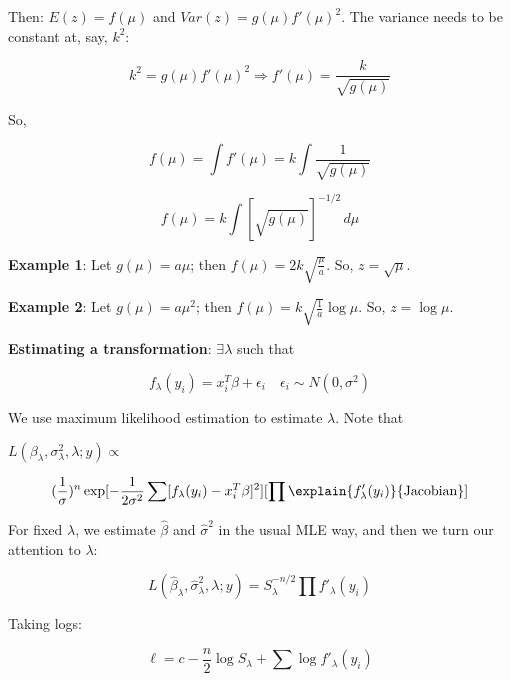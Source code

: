 Then: $E(z)=f(\mu)$ and $Var(z)=g(\mu) f'(\mu)^2$. The variance needs to be constant at, say, $k^2$:

\begin{equation}
k^2 = g(\mu) f'(\mu)^2 \Rightarrow f'(\mu)=\frac{k}{\sqrt{g(\mu)}}
\end{equation}

So, 

\begin{equation}
f(\mu) = \int f'(\mu) = k\int \frac{1}{\sqrt{g(\mu)}}
\end{equation}

\begin{fmpage}{\linewidth}
\begin{equation}
f(\mu) =  k\int [\sqrt{g(\mu)}]^{-1/2}\, d\mu
\end{equation}
\end{fmpage}

\textbf{Example 1}: Let $g(\mu)=a\mu$; then $f(\mu)=2k\sqrt{\frac{\mu}{a}}$. So, $z=\sqrt{\mu}$.

\textbf{Example 2}: Let $g(\mu)=a\mu^2$; then $f(\mu)=k\sqrt{\frac{1}{a}}\log \mu$. So, $z=\log \mu$.

\textbf{Estimating a transformation}: $\exists \lambda$ such that 

\begin{equation}
f_\lambda (y_i) = x_i^T \beta + \epsilon_i \quad \epsilon_i \sim N(0, \sigma^2)
\end{equation}

We use maximum likelihood estimation to estimate $\lambda$. Note that

$L(\beta_\lambda, \sigma^2_\lambda, \lambda; y) \propto$

\begin{equation}
(\frac{1}{\sigma})^n \exp [-\frac{1}{2\sigma^2} \sum [f_\lambda(y_i)-  x_i^T \beta ]^2] [\prod \explain{f'_\lambda(y_i)}{\hbox{Jacobian}}] 
\end{equation}

For fixed $\lambda$, we estimate $\hat{\beta}$ and $\hat{\sigma}^2$ in the usual MLE way, and then we turn our attention to $\lambda$:

\begin{equation}
L(\hat{\beta}_\lambda, \hat{\sigma}^2_\lambda, \lambda; y) = S_\lambda^{-n/2}\prod f'_\lambda(y_i) 
\end{equation}

Taking logs:

\begin{equation}
\ell = c-\frac{n}{2} \log S_\lambda + \sum \log f'_\lambda(y_i)
\end{equation}


